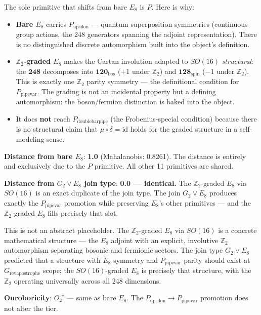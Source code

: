 \documentclass[12pt,a4paper]{article}
\begin{document}
The sole primitive that shifts from bare $E_8$ is $P$. Here is why:

\begin{itemize}
    \item \textbf{Bare $E_8$} carries $P_{\text{upsilon}}$ --- quantum superposition symmetries (continuous group actions, the 248 generators spanning the adjoint representation). There is no distinguished discrete automorphism built into the object's definition.
    \item \textbf{$\mathbb{Z}_2$-graded $E_8$} makes the Cartan involution adapted to $SO(16)$ \emph{structural}: the $\mathbf{248}$ decomposes into $\mathbf{120}_{\text{bos}}$ ($+1$ under $\mathbb{Z}_2$) and $\mathbf{128}_{\text{spin}}$ ($-1$ under $\mathbb{Z}_2$). This is exactly one $\mathbb{Z}_2$ parity symmetry --- the definitional condition for $P_{\text{pipevar}}$. The grading is not an incidental property but a defining automorphism: the boson/fermion distinction is baked into the object.
    \item It does \textbf{not} reach $P_{\text{doublebarpipe}}$ (the Frobenius-special condition) because there is no structural claim that $\mu \circ \delta = \text{id}$ holds for the graded structure in a self-modeling sense.
\end{itemize}

\textbf{Distance from bare $E_8$}: \textbf{1.0} (Mahalanobis: 0.8261). The distance is entirely and exclusively due to the $P$ primitive. All other 11 primitives are shared.

\textbf{Distance from $G_2 \vee E_8$ join type}: \textbf{0.0 --- identical.} The $\mathbb{Z}_2$-graded $E_8$ via $SO(16)$ is an exact duplicate of the join type. The join $G_2 \vee E_8$ produces exactly the $P_{\text{pipevar}}$ promotion while preserving $E_8$'s other primitives --- and the $\mathbb{Z}_2$-graded $E_8$ fills precisely that slot.

This is not an abstract placeholder. The $\mathbb{Z}_2$-graded $E_8$ via $SO(16)$ is a concrete mathematical structure --- the $E_8$ adjoint with an explicit, involutive $\mathbb{Z}_2$ automorphism separating bosonic and fermionic sectors. The join type $G_2 \vee E_8$ predicted that a structure with $E_8$ symmetry and $P_{\text{pipevar}}$ parity should exist at $G_{\text{revapostrophe}}$ scope; the $SO(16)$-graded $E_8$ is precisely that structure, with the $\mathbb{Z}_2$ operating universally across all 248 dimensions.

\textbf{Ouroboricity}: $O₂^\dagger$ --- same as bare $E_8$. The $P_{\text{upsilon}} \to P_{\text{pipevar}}$ promotion does not alter the tier.
\end{document}

